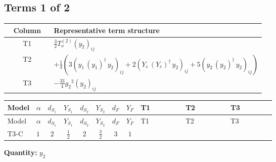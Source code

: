 \documentclass[8pt]{article}
\begin{document}
\begin{landscape}
\subsection*{Terms 1 of 2}
\begin{center}
\begin{tabular}{@{}c >{\raggedright\arraybackslash}p{0.82\linewidth}@{}}
\toprule
Column & Representative term structure \\
\midrule
T1 & \(\displaystyle \frac{3}{2} T_{\nu}^{(2)} \left({y_2}\right)_{ij}\) \\
\midrule
T2 & \(\displaystyle +\frac{1}{4} (3 \left({y_1}\,\left({y_1}\right)^{\dagger}\,{y_2}\right)_{ij}+2 \left({Y_e}\,\left({Y_e}\right)^{\dagger}\,{y_2}\right)_{ij}+5 \left({y_2}\,\left({y_2}\right)^{\dagger}\,{y_2}\right)_{ij})\) \\
\midrule
T3 & \(\displaystyle -\frac{33}{4} {g_2}^2 \left({y_2}\right)_{ij}\) \\
\midrule
\bottomrule
\end{tabular}
\end{center}
\smallskip
\tiny
\begin{longtable}{@{}llcccccc >{\raggedright\arraybackslash}p{0.21\linewidth} >{\raggedright\arraybackslash}p{0.21\linewidth} >{\raggedright\arraybackslash}p{0.21\linewidth}@{}}
\toprule
Model & $\alpha$ & $d_{S_1}$ & $Y_{S_1}$ & $d_{S_2}$ & $Y_{S_2}$ & $d_F$ & $Y_F$ & T1 & T2 & T3 \\
\midrule
\endfirsthead
\toprule
Model & $\alpha$ & $d_{S_1}$ & $Y_{S_1}$ & $d_{S_2}$ & $Y_{S_2}$ & $d_F$ & $Y_F$ & T1 & T2 & T3 \\
\midrule
\endhead
T3-C & $1$ & $2$ & $\frac{1}{2}$ & $2$ & $\frac{3}{2}$ & $3$ & $1$ & \scriptsize\adjustbox{max width=\linewidth}{$\begin{gathered} \frac{3}{2} T_{\nu}^{(2)} \left({y_2}\right)_{ij}\end{gathered}$} & \scriptsize\adjustbox{max width=\linewidth}{$\begin{gathered} +\frac{1}{4} (3 \left({y_1}\,\left({y_1}\right)^{\dagger}\,{y_2}\right)_{ij}+2 \left({Y_e}\,\left({Y_e}\right)^{\dagger}\,{y_2}\right)_{ij}+5 \left({y_2}\,\left({y_2}\right)^{\dagger}\,{y_2}\right)_{ij})\end{gathered}$} & \scriptsize\adjustbox{max width=\linewidth}{$\begin{gathered} -\frac{33}{4} {g_2}^2 \left({y_2}\right)_{ij}\end{gathered}$} \\
\midrule
\bottomrule
\end{longtable}
\clearpage
\noindent\textbf{Quantity: }$y_2$\par\smallskip

\end{landscape}
\end{document}
